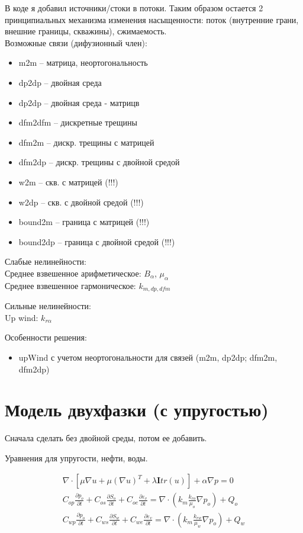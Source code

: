 \documentclass[14pt]{article}
\begin{document}
	В коде я добавил источники/стоки в потоки. Таким образом остается 2 принципиальных механизма изменения насыщенности: поток (внутренние грани, внешние границы, скважины), сжимаемость.\\
	
	Возможные связи (дифузионный член):
	\begin{itemize}
		\item m2m -- матрица, неортогональность
		\item dp2dp -- двойная среда
		\item dp2dp -- двойная среда - матрицв
		\item dfm2dfm -- дискретные трещины
		\item dfm2m -- дискр. трещины с матрицей
		\item dfm2dp -- дискр. трещины с двойной средой

		\item w2m -- скв. с матрицей (!!!)
		\item w2dp -- скв. с двойной средой (!!!)
		
		\item bound2m -- граница с матрицей (!!!)
		\item bound2dp -- граница с двойной средой (!!!)
	\end{itemize}
	
	Слабые нелинейности: \\
	Среднее взвешенное арифметическое: $B_{\alpha}$, $\mu_{\alpha}$\\
	Среднее взвешенное гармоническое: $k_{m,dp,dfm}$
	
	Сильные нелинейности:\\	
	Up wind: $k_{r \alpha}$
	
	Особенности решения:
	\begin{itemize}
		\item upWind с учетом неортогональности для связей (m2m, dp2dp; dfm2m, dfm2dp)
	\end{itemize}

\section{Модель двухфазки (с упругостью)}	

	Сначала сделать без двойной среды, потом ее добавить. 
	
	Уравнения для упругости, нефти, воды.
	
	\begin{eqnarray}
	\nabla \cdot \left[ \mu \nabla u + \mu (\nabla u)^T + \lambda \boldsymbol{I} tr(u) \right] + \alpha \nabla p = 0 \label{mech_dpp} \\
	C_{op} \frac{\partial p_{o}}{\partial t} + 
	C_{os} \frac{\partial S_{o}}{\partial t} + 
	C_{oe} \frac{\partial \varepsilon_{v}}{\partial t} = 
	\nabla \cdot \left( k_{m} \frac{k_{ro}}{\mu_{o}} \nabla p_{o} \right) + 
	Q_{o} \\
	C_{wp} \frac{\partial p_{o}}{\partial t} + 
	C_{ws} \frac{\partial S_{w}}{\partial t} + 
	C_{we} \frac{\partial \varepsilon_{v}}{\partial t} = 
	\nabla \cdot \left( k_{m} \frac{k_{rw}}{\mu_{w}} \nabla p_{o} \right) + 
	Q_{w}
	\end{eqnarray}
	
\end{document}
